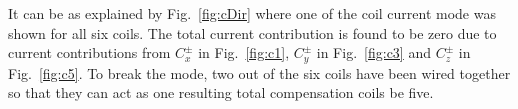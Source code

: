  It can be as explained by Fig.~\ref{fig:cDir} where one of the coil current mode was shown for all six coils. The total current contribution is found to be zero due to current contributions from $C_x^{\pm}$ in Fig.~\ref{fig:c1}, $C_y^{\pm}$ in Fig.~\ref{fig:c3} and $C_z^{\pm}$ in Fig.~\ref{fig:c5}. To break the mode, two out of the six coils have been wired together so that they can act as one resulting total compensation coils be five. 



